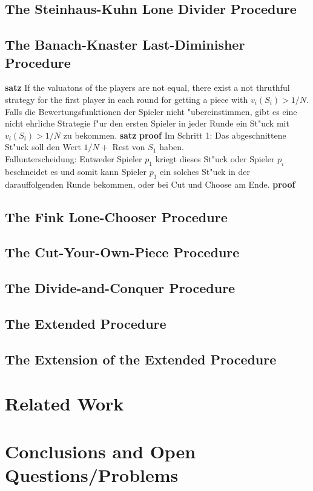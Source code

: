 \subsection{The Steinhaus-Kuhn Lone Divider Procedure}
\newpage
\subsection{The Banach-Knaster Last-Diminisher Procedure}
\textbf{satz}
If the valuatons of the players are not equal, there exist a not thruthful strategy for the first player in each round for getting a piece with $v_i(S_i)>1/N$.\\

Falls die Bewertungsfunktionen der Spieler nicht "ubereinstimmen, gibt es eine nicht ehrliche Strategie f"ur den ersten Spieler in jeder Runde ein St"uck mit $v_i(S_i)>1/N$ zu bekommen.
\textbf{satz}
\textbf{proof}
Im Schritt 1: Das abgeschnittene St"uck soll den Wert $1/N+$ Rest von $S_1$ haben.\\
Fallunterscheidung: Entweder Spieler $p_1$ kriegt dieses St"uck oder Spieler $p_i$ beschneidet es und somit kann Spieler $p_1$ ein solches St"uck in der darauffolgenden Runde bekommen, oder bei Cut und Choose am Ende.
\textbf{proof}
\newpage
\subsection{The Fink Lone-Chooser Procedure}
\newpage
\subsection{The Cut-Your-Own-Piece Procedure}
\newpage
\subsection{The Divide-and-Conquer Procedure}
\newpage
\subsection{The Extended Procedure}
\newpage
\subsection{The Extension of the Extended Procedure}
\newpage
\section{Related Work}
\pagebreak

\section{Conclusions and Open Questions/Problems}
\pagebreak


